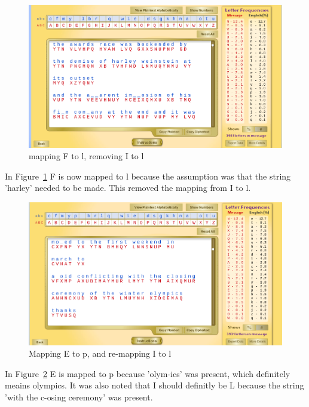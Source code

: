 \documentclass[12pt]{article}
\begin{document}
\begin{figure}[H]
    \begin{center}
        \includegraphics[scale=0.48]{c14.png}
    \end{center}{}
    \caption{mapping F to l, removing I to l}
    \label{fig:c14}
\end{figure}

In Figure~\ref{fig:c14} F is now mapped to l because the assumption was that the string 'harley' needed to be made. This
removed the mapping from I to l.

\begin{figure}[H]
    \begin{center}
        \includegraphics[scale=0.48]{c15.png}
    \end{center}{}
    \caption{Mapping E to p, and re-mapping I to l}
    \label{fig:c15}
\end{figure}

In Figure~\ref{fig:c15} E is mapped to p because 'olym-ics' was present, which definitely meains olympics. It was also
noted that I should definitly be L because the string 'with the c-osing ceremony' was present.
\end{document}
